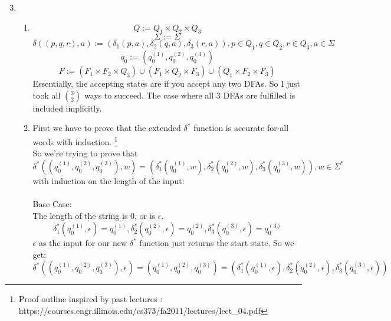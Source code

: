 \usepackage{amsmath}

\oddsidemargin 0in
\evensidemargin 0in
\textwidth 6.5in
\topmargin -0.5in
\textheight 9.0in
\newcommand{\norm}[1]{\left\lVert #1 \right\rVert}




\pagestyle{myheadings}

\begin{enumerate}
  \setcounter{enumi}{2}
\item
  \begin{enumerate}
    \item
      $$Q := Q_1 \times Q_2 \times Q_3$$
      $$\Sigma := \Sigma$$
      $$\delta ((p,q,r), a) := (\delta_1(p,a), \delta_2(q,a), \delta_3(r,a)), p \in Q_1, q \in Q_2, r \in Q_3, a \in \Sigma$$
      $$q_0 := (q_0^{(1)}, q_0^{(2)}, q_0^{(3)})$$
      $$F := (F_1 \times F_2 \times Q_3) \cup (F_1 \times Q_2 \times F_3) \cup (Q_1 \times F_2 \times F_3)$$
      Essentially, the accepting states are if you accept any two DFAs. So I just took all $3 \choose 2$ ways to succeed. The case where all 3 DFAs are fulfilled is included implicitly.\\

    \item
      First we have to prove that the extended $\delta^*$ function is accurate for all words with induction. \footnote{Proof outline inspired by past lectures : https://courses.engr.illinois.edu/cs373/fa2011/lectures/lect\_04.pdf} \\
      So we're trying to prove that $\delta^*((q_0^{(1)},q_0^{(2)},q_0^{(3)}), w) = (\delta_1^*(q_0^{(1)}, w),\delta_2^*(q_0^{(2)}, w), \delta_3^*(q_0^{(3)}, w)), w \in \Sigma^*$ with induction on the length of the input:\\\\

      Base Case:\\
      The length of the string is 0, or is $\epsilon$.\\
      $$\delta_1^*(q_0^{(1)}, \epsilon) = q_0^{(1)}, \delta_2^*(q_0^{(2)}, \epsilon) = q_0^{(2)}, \delta_3^*(q_0^{(3)}, \epsilon) = q_0^{(3)}$$
      $\epsilon$ as the input for our new $\delta^*$ function just returns the start state. So we get:
      $$\delta^*((q_0^{(1)},q_0^{(2)},q_0^{(3)}), \epsilon) = (q_0^{(1)},q_0^{(2)},q_0^{(3)}) = (\delta_1^*(q_0^{(1)}, \epsilon),\delta_2^*(q_0^{(2)}, \epsilon), \delta_3^*(q_0^{(3)}, \epsilon))$$


\end{enumerate}
\end{enumerate}

